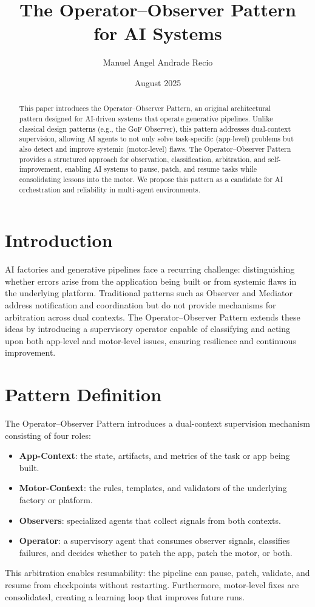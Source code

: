 \documentclass[11pt,a4paper]{article}
\title{The Operator--Observer Pattern for AI Systems}
\author{Manuel Angel Andrade Recio}
\date{August 2025}
\begin{document}
\maketitle

\begin{abstract}
This paper introduces the Operator--Observer Pattern, an original architectural pattern designed for AI-driven systems that operate generative pipelines. Unlike classical design patterns (e.g., the GoF Observer), this pattern addresses dual-context supervision, allowing AI agents to not only solve task-specific (app-level) problems but also detect and improve systemic (motor-level) flaws. The Operator--Observer Pattern provides a structured approach for observation, classification, arbitration, and self-improvement, enabling AI systems to pause, patch, and resume tasks while consolidating lessons into the motor. We propose this pattern as a candidate for AI orchestration and reliability in multi-agent environments.
\end{abstract}

\section{Introduction}
AI factories and generative pipelines face a recurring challenge: distinguishing whether errors arise from the application being built or from systemic flaws in the underlying platform. Traditional patterns such as Observer and Mediator address notification and coordination but do not provide mechanisms for arbitration across dual contexts. The Operator--Observer Pattern extends these ideas by introducing a supervisory operator capable of classifying and acting upon both app-level and motor-level issues, ensuring resilience and continuous improvement.

\section{Pattern Definition}
The Operator--Observer Pattern introduces a dual-context supervision mechanism consisting of four roles:
\begin{itemize}
    \item \textbf{App-Context}: the state, artifacts, and metrics of the task or app being built.
    \item \textbf{Motor-Context}: the rules, templates, and validators of the underlying factory or platform.
    \item \textbf{Observers}: specialized agents that collect signals from both contexts.
    \item \textbf{Operator}: a supervisory agent that consumes observer signals, classifies failures, and decides whether to patch the app, patch the motor, or both.
\end{itemize}
This arbitration enables resumability: the pipeline can pause, patch, validate, and resume from checkpoints without restarting. Furthermore, motor-level fixes are consolidated, creating a learning loop that improves future runs.
\end{document}
